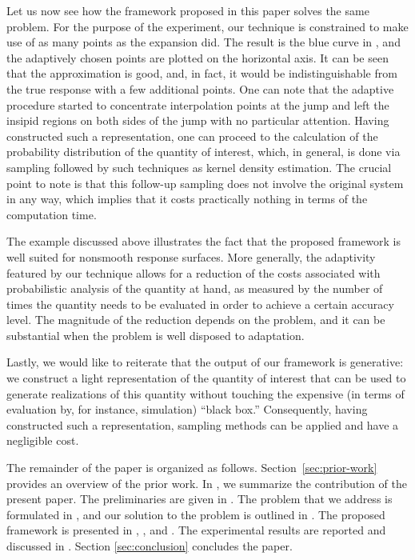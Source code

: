 Let us now see how the framework proposed in this paper solves the same problem.
For the purpose of the experiment, our technique is constrained to make use of
as many points as the  expansion did. The result is the blue curve in
, and the adaptively chosen points are plotted on the
horizontal axis. It can be seen that the approximation is good, and, in fact, it
would be indistinguishable from the true response with a few additional points.
One can note that the adaptive procedure started to concentrate interpolation
points at the jump and left the insipid regions on both sides of the jump with
no particular attention. Having constructed such a representation, one can
proceed to the calculation of the probability distribution of the quantity of
interest, which, in general, is done via sampling followed by such techniques as
kernel density estimation. The crucial point to note is that this follow-up
sampling does not involve the original system in any way, which implies that it
costs practically nothing in terms of the computation time.

The example discussed above illustrates the fact that the proposed framework is
well suited for nonsmooth response surfaces. More generally, the adaptivity
featured by our technique allows for a reduction of the costs associated with
probabilistic analysis of the quantity at hand, as measured by the number of
times the quantity needs to be evaluated in order to achieve a certain accuracy
level. The magnitude of the reduction depends on the problem, and it can be
substantial when the problem is well disposed to adaptation.

Lastly, we would like to reiterate that the output of our framework is
generative: we construct a light representation of the quantity of interest that
can be used to generate realizations of this quantity without touching the
expensive (in terms of evaluation by, for instance, simulation) ``black box.''
Consequently, having constructed such a representation, sampling methods can be
applied and have a negligible cost.

The remainder of the paper is organized as follows. Section~\ref{sec:prior-work}
provides an overview of the prior work. In , we summarize the
contribution of the present paper. The preliminaries are given in
. The problem that we address is formulated in
, and our solution to the problem is outlined in .
The proposed framework is presented in , ,
and . The experimental results are reported and discussed in
. Section \ref{sec:conclusion} concludes the paper.
